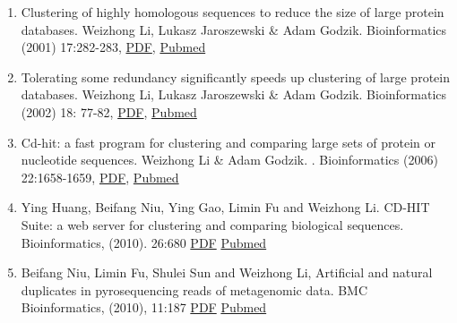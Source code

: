 \documentclass[12pt,a4paper]{article}
\begin{document}
\begin{enumerate}
 \item  Clustering of highly homologous sequences to reduce the size of large protein databases. Weizhong Li, Lukasz Jaroszewski \& Adam Godzik. Bioinformatics (2001) 17:282-283, \href{http:\slash \slash bioinformatics.oupjournals.org\slash cgi\slash reprint\slash 17\slash 3\slash 282.pdf}{PDF}, \href{http:\slash \slash www.ncbi.nlm.nih.gov\slash entrez\slash query.fcgi?cmd=Retrieve&db=pubmed&dopt=Abstract&list_uids=11294794}{Pubmed}

\item  Tolerating some redundancy significantly speeds up clustering of large protein databases. Weizhong Li, Lukasz Jaroszewski \& Adam Godzik. Bioinformatics (2002) 18: 77-82, \href{http:\slash \slash bioinformatics.oupjournals.org\slash cgi\slash reprint\slash 18\slash 1\slash 77.pdf}{PDF}, \href{http:\slash \slash www.ncbi.nlm.nih.gov\slash entrez\slash query.fcgi?cmd=Retrieve&db=pubmed&dopt=Abstract&list_uids=11836214}{Pubmed}

\item  Cd-hit: a fast program for clustering and comparing large sets of protein or nucleotide sequences. Weizhong Li \& Adam Godzik. . Bioinformatics (2006) 22:1658-1659, \href{http:\slash \slash bioinformatics.oxfordjournals.org\slash cgi\slash reprint\slash 22\slash 13\slash 1658}{PDF}, \href{http:\slash \slash www.ncbi.nlm.nih.gov\slash entrez\slash query.fcgi?db=pubmed&cmd=Retrieve&dopt=Abstract&list_uids=16731699}{Pubmed}

\item  Ying Huang, Beifang Niu, Ying Gao, Limin Fu and Weizhong Li. CD-HIT Suite: a web server for clustering and comparing biological sequences. Bioinformatics, (2010). 26:680 \href{http:\slash \slash bioinformatics.oxfordjournals.org\slash cgi\slash reprint\slash btq003v1}{PDF} \href{http:\slash \slash www.ncbi.nlm.nih.gov\slash pubmed\slash 20053844}{Pubmed}

\item  Beifang Niu, Limin Fu, Shulei Sun and Weizhong Li, Artificial and natural duplicates in pyrosequencing reads of metagenomic data. BMC Bioinformatics, (2010), 11:187 \href{http:\slash \slash www.biomedcentral.com\slash content\slash pdf\slash 1471-2105-11-187.pdf}{PDF} \href{http:\slash \slash www.ncbi.nlm.nih.gov\slash pubmed\slash 20388221}{Pubmed}

\end{enumerate}
\end{document}
